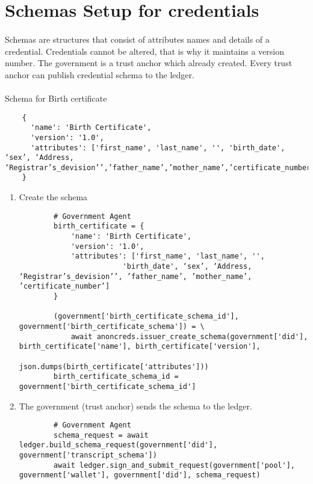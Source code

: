 \section{Schemas Setup for credentials}

\paragraph{}
Schemas are structures that consist of attributes names and details of a credential. Credentials cannot be altered, that is why it maintains a version number. The government is a trust anchor which already created. Every trust anchor can publish credential schema to the ledger.

\paragraph{}
Schema for Birth certificate

\begin{verbatim}
    {
      'name': 'Birth Certificate',
      'version': '1.0',
      'attributes': ['first_name', 'last_name', '', 'birth_date', ‘sex’, ‘Address, ‘Registrar’s_devision’’,’father_name’,’mother_name’,’certificate_number’]
    }
\end{verbatim}

\begin{enumerate}
    \item Create the schema 
    \begin{verbatim}
        # Government Agent
        birth_certificate = {
            'name': 'Birth Certificate',
            'version': '1.0',
            'attributes': ['first_name', 'last_name', '',
                        'birth_date', ‘sex’, ‘Address, ‘Registrar’s_devision’’, ’father_name’, ’mother_name’, ’certificate_number’]
        }

        (government['birth_certificate_schema_id'], government['birth_certificate_schema']) = \
            await anoncreds.issuer_create_schema(government['did'], birth_certificate['name'], birth_certificate['version'],
                                                json.dumps(birth_certificate['attributes']))
        birth_certificate_schema_id = government['birth_certificate_schema_id']
    \end{verbatim}

    \item The government (trust anchor) sends the schema to the ledger.
    \begin{verbatim}
        # Government Agent
        schema_request = await ledger.build_schema_request(government['did'], government['transcript_schema'])
        await ledger.sign_and_submit_request(government['pool'], government['wallet'], government['did'], schema_request)
    \end{verbatim}
\end{enumerate}

